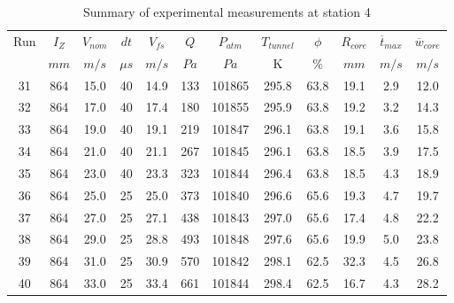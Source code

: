 \begin{table}[H]
\begin{center}
\begin{tabular}{|cccccccccccc|}
	\hline
	Run & $I_Z$ & $V_{nom}$ & $dt$ & $V_{fs}$ & $Q$ & $P_{atm}$ & $T_{tunnel}$ & $\phi$ & $R_{core}$ & $\overline{t}_{max}$ & $\overline{w}_{core}$\\
	  & $mm$ & $m/s$ & $\mu s$ & $m/s$ & $Pa$ & $Pa$ & K & $\%$ & $mm$ & $m/s$ & $m/s$\\
	\hline
	31 & 864 & 15.0 & 40 & 14.9 & 133 & 101865 & 295.8 & 63.8 & 19.1 & 2.9 & 12.0\\
	32 & 864 & 17.0 & 40 & 17.4 & 180 & 101855 & 295.9 & 63.8 & 19.2 & 3.2 & 14.3\\
	33 & 864 & 19.0 & 40 & 19.1 & 219 & 101847 & 296.1 & 63.8 & 19.1 & 3.6 & 15.8\\
	34 & 864 & 21.0 & 40 & 21.1 & 267 & 101845 & 296.1 & 63.8 & 18.5 & 3.9 & 17.5\\
	35 & 864 & 23.0 & 40 & 23.3 & 323 & 101844 & 296.4 & 63.8 & 18.5 & 4.3 & 18.9\\
	36 & 864 & 25.0 & 25 & 25.0 & 373 & 101840 & 296.6 & 65.6 & 19.3 & 4.7 & 19.7\\
	37 & 864 & 27.0 & 25 & 27.1 & 438 & 101843 & 297.0 & 65.6 & 17.4 & 4.8 & 22.2\\
	38 & 864 & 29.0 & 25 & 28.8 & 493 & 101848 & 297.6 & 65.6 & 19.9 & 5.0 & 23.8\\
	39 & 864 & 31.0 & 25 & 30.9 & 570 & 101842 & 298.1 & 62.5 & 32.3 & 4.5 & 26.8\\
	40 & 864 & 33.0 & 25 & 33.4 & 661 & 101844 & 298.4 & 62.5 & 16.7 & 4.3 & 28.2\\
	\hline
\end{tabular}
\caption{Summary of experimental measurements at station 4}
\label{table:experiment_results_4}
\end{center}
\end{table}

